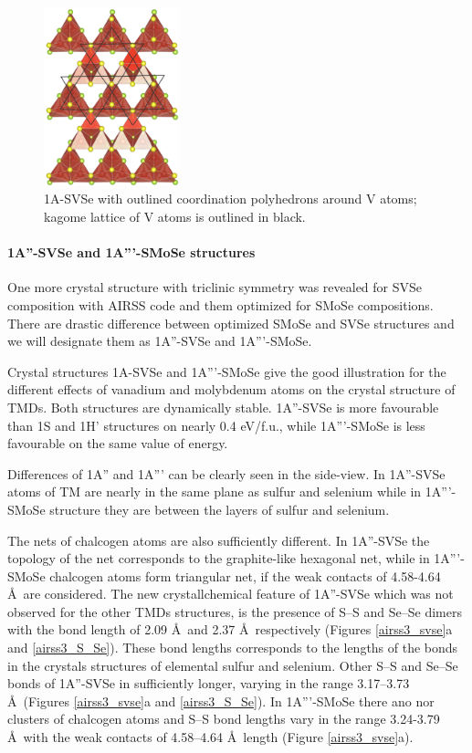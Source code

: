 \documentclass[a4paperm]{article}
\begin{document}
\begin{figure}[H]
        \includegraphics[width=0.35\textwidth]{airss1_v_poly.png}
        \caption{1A-SVSe with outlined coordination polyhedrons around V atoms; kagome lattice of V atoms is outlined in black.}
\label{airss1_poly}
\end{figure}




\paragraph{1A''-SVSe and 1A'''-SMoSe structures}
One more crystal structure with triclinic symmetry was revealed for SVSe composition with AIRSS code and them optimized for SMoSe compositions.
There are drastic difference between optimized SMoSe and SVSe structures and we will designate them as 1A''-SVSe and 1A'''-SMoSe.

Crystal structures  1A-SVSe and 1A'''-SMoSe give the good illustration for the different effects of vanadium and molybdenum atoms on the crystal structure of TMDs.
Both structures are dynamically stable.
1A''-SVSe is more favourable than 1S and 1H' structures on nearly 0.4 eV/f.u., while 1A'''-SMoSe is less favourable on the same value of energy.

Differences of 1A'' and 1A''' can be clearly seen in the side-view.
In 1A''-SVSe atoms of TM are nearly in the same plane as sulfur and selenium while in 1A'''-SMoSe structure they are between the layers of sulfur and selenium.

The nets of chalcogen atoms are also sufficiently different.
In 1A''-SVSe the topology of the net corresponds to the graphite-like hexagonal net, while in 1A'''-SMoSe chalcogen atoms form triangular net, if the weak contacts of 4.58-4.64 \AA\ are considered.
The new crystallchemical feature of 1A''-SVSe which was not observed for the other TMDs structures, is the presence of S--S and Se--Se dimers with the bond length of 2.09 \AA\ and 2.37 \AA\, respectively (Figures \ref{airss3_svse}a and \ref{airss3_S_Se}).
These bond lengths corresponds to the lengths of the bonds in the crystals structures of elemental sulfur and selenium.
Other S--S and Se--Se bonds of 1A''-SVSe in  sufficiently longer, varying in the range 3.17--3.73 \AA\ (Figures \ref{airss3_svse}a and \ref{airss3_S_Se}).
In 1A'''-SMoSe there ano nor clusters of chalcogen atoms and S--S bond lengths vary in the range 3.24-3.79 \AA\ with the weak contacts of 4.58--4.64 \AA\ length (Figure \ref{airss3_svse}a).
\end{document}
